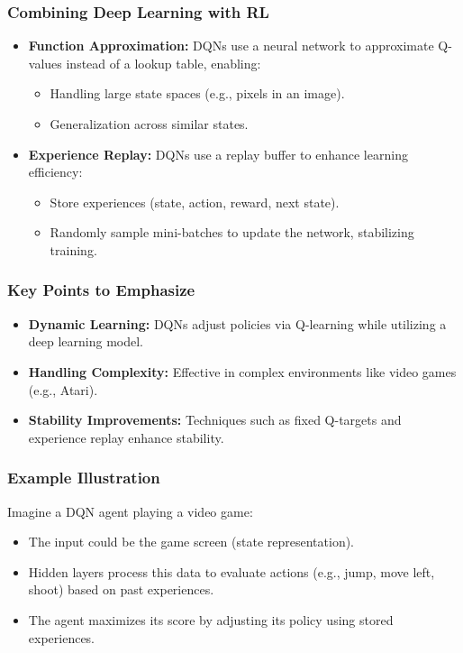 \documentclass[aspectratio=169]{beamer}
\begin{document}
\begin{frame}[fragile]
  \frametitle{Combining Deep Learning with RL}
  
  \begin{itemize}
    \item \textbf{Function Approximation:} 
      DQNs use a neural network to approximate Q-values instead of a lookup table, enabling:
      \begin{itemize}
        \item Handling large state spaces (e.g., pixels in an image).
        \item Generalization across similar states.
      \end{itemize}
    
    \item \textbf{Experience Replay:} 
      DQNs use a replay buffer to enhance learning efficiency:
      \begin{itemize}
        \item Store experiences (state, action, reward, next state).
        \item Randomly sample mini-batches to update the network, stabilizing training.
      \end{itemize}
  \end{itemize}
\end{frame}

\begin{frame}[fragile]
  \frametitle{Key Points to Emphasize}
  
  \begin{itemize}
    \item \textbf{Dynamic Learning:} DQNs adjust policies via Q-learning while utilizing a deep learning model.
    \item \textbf{Handling Complexity:} Effective in complex environments like video games (e.g., Atari).
    \item \textbf{Stability Improvements:} Techniques such as fixed Q-targets and experience replay enhance stability.
  \end{itemize}
\end{frame}

\begin{frame}[fragile]
  \frametitle{Example Illustration}
  
  Imagine a DQN agent playing a video game:
  \begin{itemize}
    \item The input could be the game screen (state representation).
    \item Hidden layers process this data to evaluate actions (e.g., jump, move left, shoot) based on past experiences.
    \item The agent maximizes its score by adjusting its policy using stored experiences.
  \end{itemize}
\end{frame}
\end{document}
